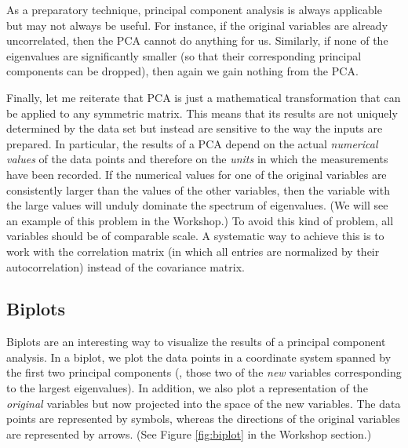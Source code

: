 As a preparatory technique, principal component analysis is always
applicable but may not always be useful. For instance, if the original
variables are already uncorrelated, then the PCA cannot do anything
for us. Similarly, if none of the eigenvalues are significantly
smaller (so that their corresponding principal components can be
dropped), then again we gain nothing from the PCA.

Finally, let me reiterate that PCA is just a mathematical
transformation that can be applied to any symmetric matrix. This means
that its results are not uniquely determined by the data set but
instead are sensitive to the way the inputs are prepared. In
particular, the results of a PCA depend on the actual \emph{numerical
  values} of the data points and therefore on the \emph{units} in
which the measurements have been recorded. If the numerical values for
one of the original variables are consistently larger than the values
of the other variables, then the variable with the large values will
unduly dominate the spectrum of eigenvalues. (We will see an example
of this problem in the Workshop.) To avoid this kind of problem, all
variables should be of comparable scale. A systematic way to achieve
this is to work with the correlation matrix (in which all entries are
normalized by their autocorrelation) instead of the covariance matrix.

\subsection{Biplots}

  
Biplots are an interesting way to visualize the results of a principal
component analysis.  In a biplot, we plot the data points in a
coordinate system spanned by the first two principal components (\ie,
those two of the \emph{new} variables corresponding to the largest
eigenvalues). In addition, we also\vadjust{\pagebreak} plot a representation of the
\emph{original} variables but now projected into the space of the new
variables. The data points are represented by symbols, whereas the
directions of the original variables are represented by arrows. (See
Figure \ref{fig:biplot} in the Workshop section.)

